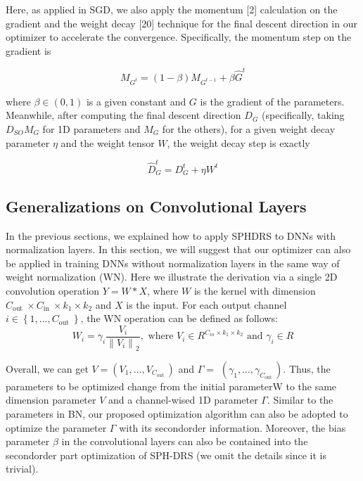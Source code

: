 \documentclass[conference]{IEEEtran}
\begin{document}
Here, as applied in SGD, we also apply the momentum [2] calculation on the gradient and the weight decay [20] technique for the final descent direction in our optimizer to accelerate the convergence. Specifically, the momentum step on the gradient is


\begin{equation*}
M_{G^{t}}=(1-\beta) M_{G^{t-1}}+\beta \hat{G}^{t} \tag{7}
\end{equation*}


where $\beta \in(0,1)$ is a given constant and $G$ is the gradient of the parameters. Meanwhile, after computing the final descent direction $D_{G}$ (specifically, taking $D_{S O} M_{G}$ for 1D parameters and $M_{G}$ for the others), for a given weight decay parameter $\eta$ and the weight tensor $W$, the weight decay step is exactly


\begin{equation*}
\hat{D}_{G}^{t}=D_{G}^{t}+\eta W^{t} \tag{8}
\end{equation*}


\subsection{Generalizations on Convolutional Layers}

In the previous sections, we explained how to apply SPHDRS to DNNs with normalization layers. In this section, we will suggest that our optimizer can also be applied in training DNNs without normalization layers in the same way of weight normalization (WN). Here we illustrate the derivation via a single 2D convolution operation $Y=W * X$, where $W$ is the kernel with dimension $C_{\text {out }} \times C_{\text {in }} \times k_{1} \times k_{2}$ and $X$ is the input. For each output channel $i \in\left\{1, \ldots, C_{\text {out }}\right\}$, the WN operation can be defined as follows:
%
\begin{equation*}
W_{i}=\gamma_{i} \frac{V_{i}}{\left\|V_{i}\right\|_{2}}, \text { where } V_{i} \in R^{C_{i n} \times k_{1} \times k_{2}} \text { and } \gamma_{i} \in R \tag{9}
\end{equation*}

Overall, we can get $V=\left(V_{1}, \ldots, V_{C_{\text {out }}}\right)$ and $\Gamma=$ $\left(\gamma_{1}, \ldots, \gamma_{C_{\text {out }}}\right)$. Thus, the parameters to be optimized change from the initial parameterW to the same dimension parameter $V$ and a channel-wised 1D parameter $\Gamma$. Similar to the parameters in BN, our proposed optimization algorithm can also be adopted to optimize the parameter $\Gamma$ with its secondorder information. Moreover, the bias parameter $\beta$ in the convolutional layers can also be contained into the secondorder part optimization of SPH-DRS (we omit the details since it is trivial).
\end{document}
